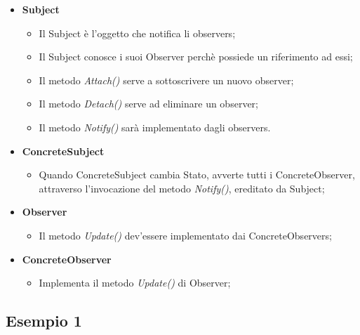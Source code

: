 \begin{itemize}
	\item \textbf{Subject}
	\begin{itemize}
		\item Il Subject è l'oggetto che notifica li observers;
		\item Il Subject conosce i suoi Observer perchè possiede un riferimento ad essi;
		\item Il metodo \textit{Attach()} serve a sottoscrivere un nuovo observer;
		\item Il metodo \textit{Detach()} serve ad eliminare un observer;
		\item Il metodo \textit{Notify()} sarà implementato dagli observers.
	\end{itemize}
	\item \textbf{ConcreteSubject}
	\begin{itemize}
		\item Quando ConcreteSubject cambia Stato, avverte tutti i ConcreteObserver, attraverso l'invocazione del metodo \textit{Notify()}, ereditato da Subject;
	\end{itemize}
		\item \textbf{Observer}
	\begin{itemize}
		\item Il metodo \textit{Update()} dev'essere implementato dai ConcreteObservers;
	\end{itemize}
	\item \textbf{ConcreteObserver}
	\begin{itemize}
		\item Implementa il metodo \textit{Update()} di Observer;
	\end{itemize}
\end{itemize}

\subsection{Esempio 1}

